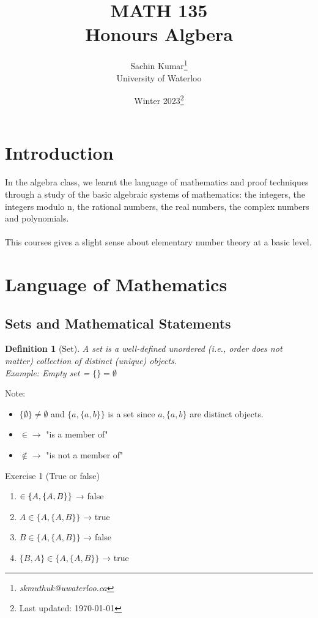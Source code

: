 \documentclass[10pt]{article}
\theoremstyle{break}
\newtheorem{defn}{Definition}[subsection]
\newcommand{\subject}{MATH 135 \\ Honours Algbera}
\newcommand{\semester}{Winter 2023}
\begin{document}
\let\ref\Cref

\title{\subject}
\author{Sachin Kumar\thanks{\itshape skmuthuk@uwaterloo.ca}\\ University of Waterloo}
\date{\semester\thanks{Last updated: \today}}

\maketitle
\newpage
\tableofcontents
\setcounter{section}{-1}
\newpage







\section{Introduction}
In the algebra class, we learnt the language of mathematics and proof techniques through a study of the basic algebraic systems of mathematics: the integers, the integers modulo n, the rational numbers, the real numbers, the complex numbers and polynomials.
\\ \vspace{0.5ex} \\
This courses gives a slight sense about elementary number theory at a basic level. 

\newpage


\section{Language of Mathematics}
\subsection{Sets and Mathematical Statements}
\begin{defn}[Set]
A set is a well-defined unordered (i.e., order does not matter) collection of distinct (unique) objects.\\
Example: 
Empty set = $\{\} = \emptyset$
\end{defn}
Note:
\begin{itemize}
    \item $\{\emptyset\} \ne \emptyset$ and $\{a, \{a, b\}\}$ is a set since $a, \{a, b\}$ are distinct objects.
    \item $\in \to $ "is a member of"
    \item $\notin \to $ "is not a member of"
\end{itemize}
Exercise 1 (True or false)
\begin{enumerate}
    \item $\empty \in \{A, \{A, B\}\}$ → false
    \item $A \in \{A, \{A, B\}\}$ → true
    \item $B \in \{A, \{A, B\}\}$ → false
    \item $\{B, A\} \in \{A , \{A, B\}\}$ → true
\end{enumerate}
\end{document}
